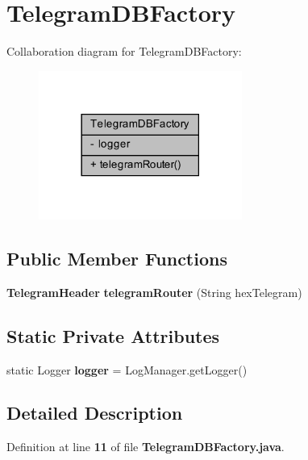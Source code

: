 \section{Telegram\+D\+B\+Factory}
\label{classch_1_1bfh_1_1gr33nopo55um_1_1enocean_1_1persistence_1_1TelegramDBFactory}


Collaboration diagram for Telegram\+D\+B\+Factory\+:\nopagebreak
\begin{figure}[H]
\begin{center}
\leavevmode
\includegraphics[width=189pt]{df/dfd/classch_1_1bfh_1_1gr33nopo55um_1_1enocean_1_1persistence_1_1TelegramDBFactory__coll__graph}
\end{center}
\end{figure}
\subsection*{Public Member Functions}
\begin{DoxyCompactItemize}
\item 
{\bf Telegram\+Header} {\bf telegram\+Router} (String hex\+Telegram)
\end{DoxyCompactItemize}
\subsection*{Static Private Attributes}
\begin{DoxyCompactItemize}
\item 
static Logger {\bf logger} = Log\+Manager.\+get\+Logger()
\end{DoxyCompactItemize}


\subsection{Detailed Description}


Definition at line {\bf 11} of file {\bf Telegram\+D\+B\+Factory.\+java}.



